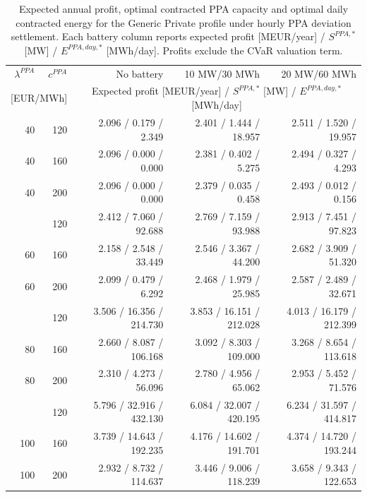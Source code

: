 \begin{table}[htbp]
\centering
\small
\caption{Expected annual profit, optimal contracted PPA capacity and optimal daily contracted energy for the Generic Private profile under hourly PPA deviation settlement. Each battery column reports expected profit [MEUR/year] / $S^{PPA,*}$ [MW] / $E^{PPA,day,*}$ [MWh/day]. Profits exclude the CVaR valuation term.}
\label{tab:battery_sensitivity_generic_private}
\begin{tabular*}{\textwidth}{@{\extracolsep{\fill}}rrrrr@{}}
\toprule
$\lambda^{PPA}$ & $c^{PPA}$ & No battery & 10 MW/30 MWh & 20 MW/60 MWh \\
\multicolumn{2}{c}{[EUR/MWh]} & \multicolumn{3}{c}{Expected profit [MEUR/year] / $S^{PPA,*}$ [MW] / $E^{PPA,day,*}$ [MWh/day]} \\
\midrule
40 & 120 & 2.096 / 0.179 / 2.349 & 2.401 / 1.444 / 18.957 & 2.511 / 1.520 / 19.957 \\
40 & 160 & 2.096 / 0.000 / 0.000 & 2.381 / 0.402 / 5.275 & 2.494 / 0.327 / 4.293 \\
40 & 200 & 2.096 / 0.000 / 0.000 & 2.379 / 0.035 / 0.458 & 2.493 / 0.012 / 0.156 \\
\addlinespace
60 & 120 & 2.412 / 7.060 / 92.688 & 2.769 / 7.159 / 93.988 & 2.913 / 7.451 / 97.823 \\
60 & 160 & 2.158 / 2.548 / 33.449 & 2.546 / 3.367 / 44.200 & 2.682 / 3.909 / 51.320 \\
60 & 200 & 2.099 / 0.479 / 6.292 & 2.468 / 1.979 / 25.985 & 2.587 / 2.489 / 32.671 \\
\addlinespace
80 & 120 & 3.506 / 16.356 / 214.730 & 3.853 / 16.151 / 212.028 & 4.013 / 16.179 / 212.399 \\
80 & 160 & 2.660 / 8.087 / 106.168 & 3.092 / 8.303 / 109.000 & 3.268 / 8.654 / 113.618 \\
80 & 200 & 2.310 / 4.273 / 56.096 & 2.780 / 4.956 / 65.062 & 2.953 / 5.452 / 71.576 \\
\addlinespace
100 & 120 & 5.796 / 32.916 / 432.130 & 6.084 / 32.007 / 420.195 & 6.234 / 31.597 / 414.817 \\
100 & 160 & 3.739 / 14.643 / 192.235 & 4.176 / 14.602 / 191.701 & 4.374 / 14.720 / 193.244 \\
100 & 200 & 2.932 / 8.732 / 114.637 & 3.446 / 9.006 / 118.239 & 3.658 / 9.343 / 122.653 \\
\bottomrule
\end{tabular*}
\end{table}

